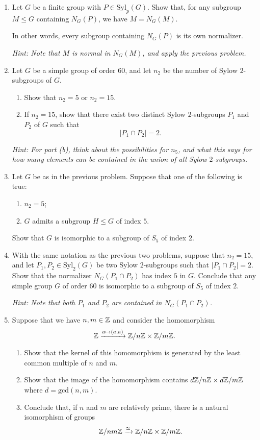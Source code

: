\documentclass{amsart}
\begin{document}
\begin{enumerate}[itemsep=0.15in]
\item Let $G$ be a finite group with $P\in \mathrm{Syl}_p(G)$. Show that, for any subgroup $M\leq G$ containing $N_G(P)$, we have $M = N_G(M)$. 

In other words, every subgroup containing $N_G(P)$ is its own normalizer.

\emph{Hint: Note that $M$ is normal in $N_G(M)$, and apply the previous problem.}

\vspace{0.2in}

\item Let $G$ be a simple group of order $60$, and let $n_2$ be the number of Sylow $2$-subgroups of $G$.
\begin{enumerate}
	\item Show that $n_2 = 5$ or $n_2 = 15$.
	\item If $n_2 = 15$, show that there exist two distinct Sylow $2$-subgroups $P_1$ and $P_2$ of $G$ such that 
\[
	|P_1\cap P_2| = 2.
\]
\end{enumerate}

\emph{Hint: For part (b), think about the possibilities for $n_5$, and what this says for how many elements can be contained in the union of all Sylow $2$-subgroups.}


\item Let $G$ be as in the previous problem. Suppose that one of the following is true:
\begin{enumerate}
	\item $n_2 = 5$;
	\item $G$ admits a subgroup $H\leq G$ of index $5$.
\end{enumerate}
Show that $G$ is isomorphic to a subgroup of $S_5$ of index $2$.


\item With the same notation as the previous two problems, suppose that $n_2 = 15$, and let $P_1,P_2\in \mathrm{Syl}_2(G)$ be two Sylow $2$-subgroups such that $|P_1\cap P_2| = 2$. Show that the normalizer $N_G(P_1\cap P_2)$ has index $5$ in $G$. Conclude that any simple group $G$ of order $60$ is isomorphic to a subgroup of $S_5$ of index $2$.

\emph{Hint: Note that both $P_1$ and $P_2$ are contained in $N_G(P_1\cap P_2)$.}


\item Suppose that we have $n,m\in \mathbb{Z}$ and consider the homomorphism
\[
\mathbb{Z} \xrightarrow{a\mapsto (a,a)}\mathbb{Z}/n\mathbb{Z}\times \mathbb{Z}/m\mathbb{Z}.
\]
\begin{enumerate}
	\item Show that the kernel of this homomorphism is generated by the least common multiple of $n$ and $m$.
	\item Show that the image of the homomorphism contains $d\mathbb{Z}/n\mathbb{Z} \times d\mathbb{Z}/m\mathbb{Z}$ where $d = \mathrm{gcd}(n,m)$.
	\item Conclude that, if $n$ and $m$ are relatively prime, there is a natural isomorphism of groups
\[
\mathbb{Z}/nm\mathbb{Z} \xrightarrow{\simeq}\mathbb{Z}/n\mathbb{Z}\times\mathbb{Z}/m\mathbb{Z}.
\]

\end{enumerate}

\end{enumerate}
\end{document}
